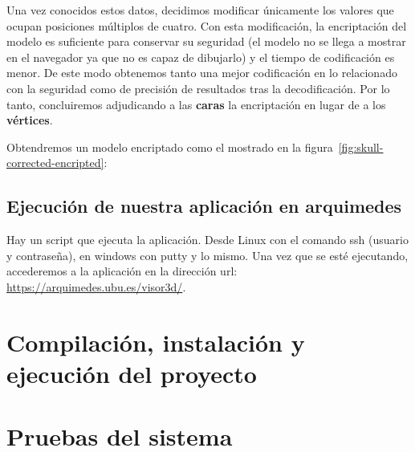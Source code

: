Una vez conocidos estos datos, decidimos modificar únicamente los valores que ocupan posiciones múltiplos de cuatro. Con esta modificación, la encriptación del modelo es suficiente para conservar su seguridad (el modelo no se llega a mostrar en el navegador ya que no es capaz de dibujarlo) y el tiempo de codificación es menor. De este modo obtenemos tanto una mejor codificación en lo relacionado con la seguridad como de precisión de resultados tras la decodificación. Por lo tanto, concluiremos adjudicando a las \textbf{caras} la encriptación en lugar de a los \textbf{vértices}.

Obtendremos un modelo encriptado como el mostrado en la figura~\ref{fig:skull-corrected-encripted}:

\subsection{Ejecución de nuestra aplicación en arquimedes}
Hay un script que ejecuta la aplicación. Desde Linux con el comando ssh (usuario y contraseña), en windows con putty y lo mismo. Una vez que se esté ejecutando, accederemos a la aplicación en la dirección url: \url{https://arquimedes.ubu.es/visor3d/}.

\section{Compilación, instalación y ejecución del proyecto}

\section{Pruebas del sistema}
